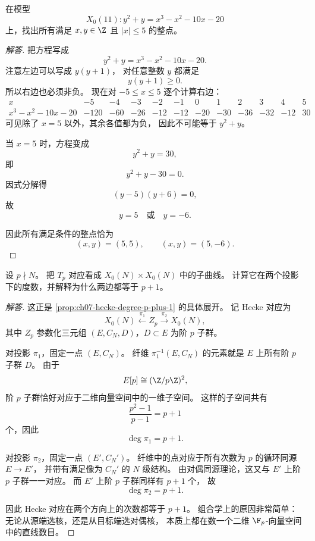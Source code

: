 \begin{exercise}
\label{ex:ch07-x011-integral-points}
在模型
\[
  X_0(11): y^2+y=x^3-x^2-10x-20
\]
上，找出所有满足 $x,y\in\Z$ 且 $|x|\le 5$ 的整点。
\end{exercise}

\begin{proof}[解答]
把方程写成
\[
  y^2+y=x^3-x^2-10x-20.
\]
注意左边可以写成 $y(y+1)$，
对任意整数 $y$ 都满足
\[
  y(y+1)\ge 0.
\]
所以右边也必须非负。
现在对 $-5\le x\le 5$ 逐个计算右边：
\[
\begin{array}{c|ccccccccccc}
 x & -5&-4&-3&-2&-1&0&1&2&3&4&5\\
 \hline
 x^3-x^2-10x-20 & -120&-60&-26&-12&-12&-20&-30&-36&-32&-12&30
\end{array}
\]
可见除了 $x=5$ 以外，其余各值都为负，
因此不可能等于 $y^2+y$。

当 $x=5$ 时，方程变成
\[
  y^2+y=30,
\]
即
\[
  y^2+y-30=0.
\]
因式分解得
\[
  (y-5)(y+6)=0,
\]
故
\[
  y=5\quad\text{或}\quad y=-6.
\]

因此所有满足条件的整点恰为
\[
  (x,y)=(5,5),\qquad (x,y)=(5,-6).
\]
\end{proof}

\begin{exercise}
\label{ex:ch07-hecke-degree}
设 $p\nmid N$。
把 $T_p$ 对应看成 $X_0(N)\times X_0(N)$ 中的子曲线。
计算它在两个投影下的度数，并解释为什么两边都等于 $p+1$。
\end{exercise}

\begin{proof}[解答]
这正是 \cref{prop:ch07-hecke-degree-p-plus-1} 的具体展开。
记 Hecke 对应为
\[
  X_0(N)\xleftarrow{\pi_1} Z_p \xrightarrow{\pi_2} X_0(N),
\]
其中 $Z_p$ 参数化三元组 $(E,C_N,D)$，$D\subset E$ 为阶 $p$ 子群。

对投影 $\pi_1$，固定一点 $(E,C_N)$。
纤维 $\pi_1^{-1}(E,C_N)$ 的元素就是 $E$ 上所有阶 $p$ 子群 $D$。
由于
\[
  E[p]\cong (\Z/p\Z)^2,
\]
阶 $p$ 子群恰好对应于二维向量空间中的一维子空间。
这样的子空间共有
\[
  \frac{p^2-1}{p-1}=p+1
\]
个，因此
\[
  \deg \pi_1=p+1.
\]

对投影 $\pi_2$，固定一点 $(E',C_N')$。
纤维中的点对应于所有次数为 $p$ 的循环同源 $E\to E'$，
并带有满足像为 $C_N'$ 的 $N$ 级结构。
由对偶同源理论，这又与 $E'$ 上阶 $p$ 子群一一对应。
而 $E'$ 上阶 $p$ 子群同样有 $p+1$ 个，
故
\[
  \deg \pi_2=p+1.
\]

因此 Hecke 对应在两个方向上的次数都等于 $p+1$。
组合学上的原因非常简单：
无论从源端选核，还是从目标端选对偶核，
本质上都在数一个二维 $\F_p$-向量空间中的直线数目。
\end{proof}

